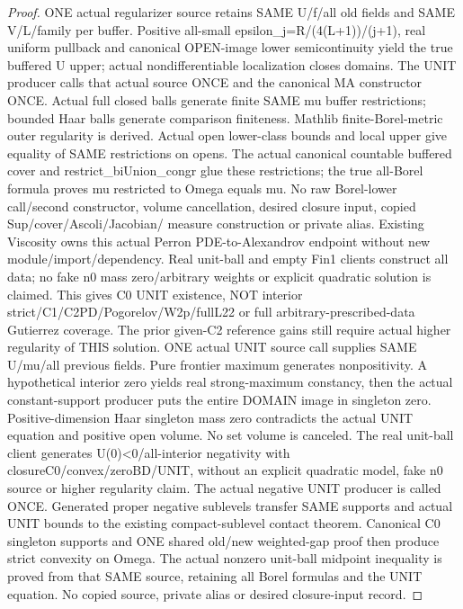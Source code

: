 \begin{proof}
  \leanok
  ONE actual regularizer source retains SAME U/f/all old fields and SAME
  V/L/family per buffer. Positive all-small epsilon\_j=R/(4(L+1))/(j+1), real
  uniform pullback and canonical OPEN-image lower semicontinuity yield the
  true buffered U upper; actual nondifferentiable localization closes domains.
  The UNIT producer calls that actual source ONCE and the canonical MA
  constructor ONCE. Actual full closed balls generate finite SAME mu buffer
  restrictions; bounded Haar balls generate comparison finiteness. Mathlib
  finite-Borel-metric outer regularity is derived. Actual open lower-class
  bounds and local upper give equality of SAME restrictions on opens. The
  actual canonical countable buffered cover and restrict\_biUnion\_congr glue
  these restrictions; the true all-Borel formula proves mu restricted to
  Omega equals mu. No raw Borel-lower call/second constructor, volume
  cancellation, desired closure input, copied Sup/cover/Ascoli/Jacobian/
  measure construction or private alias. Existing Viscosity owns this actual
  Perron PDE-to-Alexandrov endpoint without new module/import/dependency.
  Real unit-ball and empty Fin1 clients construct all data; no fake n0 mass
  zero/arbitrary weights or explicit quadratic solution is claimed. This
  gives C0 UNIT existence, NOT interior strict/C1/C2PD/Pogorelov/W2p/fullL22
  or full arbitrary-prescribed-data Gutierrez coverage. The prior given-C2
  reference gains still require actual higher regularity of THIS solution.
  ONE actual UNIT source call supplies SAME U/mu/all previous fields. Pure
  frontier maximum generates nonpositivity. A hypothetical interior zero
  yields real strong-maximum constancy, then the actual constant-support
  producer puts the entire DOMAIN image in singleton zero. Positive-dimension
  Haar singleton mass zero contradicts the actual UNIT equation and positive
  open volume. No set volume is canceled. The real unit-ball client generates
  U(0)<0/all-interior negativity with closureC0/convex/zeroBD/UNIT, without an
  explicit quadratic model, fake n0 source or higher regularity claim.
  The actual negative UNIT producer is called ONCE. Generated proper negative
  sublevels transfer SAME supports and actual UNIT bounds to the existing
  compact-sublevel contact theorem. Canonical C0 singleton supports and ONE
  shared old/new weighted-gap proof then produce strict convexity on Omega.
  The actual nonzero unit-ball midpoint inequality is proved from that SAME
  source, retaining all Borel formulas and the UNIT equation. No copied source,
  private alias or desired closure-input record.
\end{proof}

